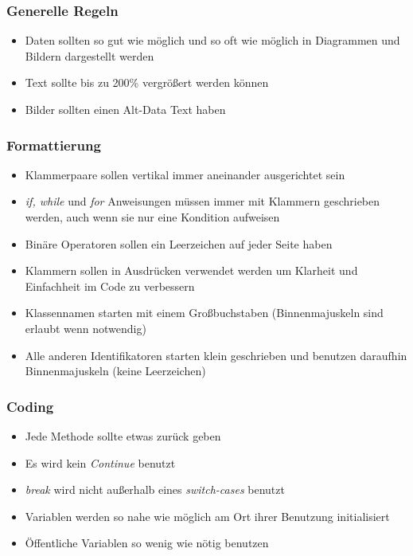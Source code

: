 \documentclass[11pt]{article}
\begin{document}
\subsubsection{Generelle Regeln}
\begin{itemize}
\item Daten sollten so gut wie möglich und so oft wie möglich in Diagrammen und Bildern dargestellt werden
\item Text sollte bis zu 200\% vergrößert werden können
\item Bilder sollten einen Alt-Data Text haben
\end{itemize}

\subsubsection{Formattierung}
\begin{itemize}
\item Klammerpaare sollen vertikal immer aneinander ausgerichtet sein
\item \textit{if, while} und \textit{for} Anweisungen müssen immer mit Klammern geschrieben werden, auch wenn sie nur eine Kondition aufweisen
\item Binäre Operatoren sollen ein Leerzeichen auf jeder Seite haben
\item Klammern sollen in Ausdrücken verwendet werden um Klarheit und Einfachheit im Code zu verbessern
\item Klassennamen starten mit einem Großbuchstaben (Binnenmajuskeln sind erlaubt wenn notwendig)
\item Alle anderen Identifikatoren starten klein geschrieben und benutzen daraufhin Binnenmajuskeln (keine Leerzeichen)
\end{itemize}

\subsubsection{Coding}
\begin{itemize}
\item Jede Methode sollte etwas zurück geben
\item Es wird kein \textit{Continue} benutzt
\item \textit{break} wird nicht außerhalb eines \textit{switch-cases} benutzt
\item Variablen werden so nahe wie möglich am Ort ihrer Benutzung initialisiert
\item Öffentliche Variablen so wenig wie nötig benutzen
\end{itemize}
\end{document}
